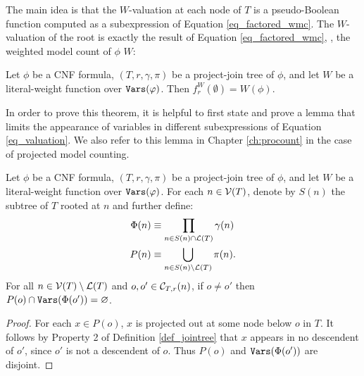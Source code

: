 The main idea is that the $W$-valuation at each node of $T$ is a pseudo-Boolean function computed as a subexpression of Equation \eqref{eq_factored_wmc}. The $W$-valuation of the root is exactly the result of Equation \eqref{eq_factored_wmc}, \ie, the weighted model count of $\phi$ \wrt{} $W$:
\begin{theorem}
\label{thm_valuation_wmc}
    Let $\phi$ be a CNF formula, $(T, r, \gamma, \pi)$ be a project-join tree of $\phi$, and let $W$ be a literal-weight function over $\texttt{\upshape Vars}(\varphi)$.
    Then $f^W_r(\emptyset) = W(\phi)$.
\end{theorem}

In order to prove this theorem, it is helpful to first state and prove a lemma that limits the appearance of variables in different subexpressions of Equation \ref{eq_valuation}. We also refer to this lemma in Chapter \ref{ch:procount} in the case of projected model counting.
\begin{lemma}
\label{lemma:projections_branch_disjoint}
Let $\phi$ be a CNF formula, $(T, r, \gamma, \pi)$ be a project-join tree of $\phi$, and let $W$ be a literal-weight function over $\texttt{\upshape Vars}(\varphi)$. For each $n \in \mathcal{V}(T)$, denote by $S(n)$ the subtree of $T$ rooted at $n$ and further define:
\begin{align*}
    \Phi(n) &\equiv \prod_{n \in S(n) \cap \mathcal{L}(T)} \gamma(n) \\
    P(n) &\equiv \bigcup_{n \in S(n) \setminus \mathcal{L}(T)} \pi(n).
\end{align*}
For all $n \in \mathcal{V}(T) \setminus \mathcal{L}(T)$ and $o, o' \in \mathcal{C}_{T,r}(n)$, if $o \neq o'$ then $P(o) \cap \texttt{\upshape Vars}(\Phi(o')) = \varnothing$.
\end{lemma}
\begin{proof}
For each $x \in P(o)$, $x$ is projected out at some node below $o$ in $T$. It follows by Property 2 of Definition \ref{def_jointree} that $x$ appears in no descendent of $o'$, since $o'$ is not a descendent of $o$. Thus $P(o)$ and $\texttt{\upshape Vars}(\Phi(o'))$ are disjoint.
\end{proof}


